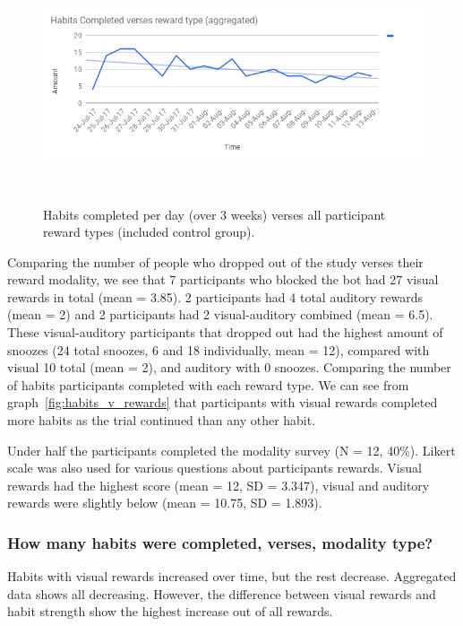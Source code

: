 \documentclass{scaffold/sigchi}
\begin{document}
\begin{figure}
  \centering
  \includegraphics[width=1\columnwidth]{figures/allhabitscompleted-v-rewards.png}
  \caption{Habits completed per day (over 3 weeks) verses all participant reward types (included control group).}~\label{fig:allhabits_v_rewards}
\end{figure}


Comparing the number of people who dropped out of the study verses their reward modality, we see that 7 participants who blocked the bot had 27 visual rewards in total (mean = 3.85). 2 participants had 4 total auditory rewards (mean = 2) and 2 participants had 2 visual-auditory combined (mean = 6.5). These visual-auditory participants that dropped out had the highest amount of snoozes (24 total snoozes, 6 and 18 individually, mean = 12), compared with visual 10 total (mean = 2), and auditory with 0 snoozes.\newline
\newline
Comparing the number of habits participants completed with each reward type. We can see from graph~\ref{fig:habits_v_rewards} that participants with visual rewards completed more habits as the trial continued than any other habit.  


Under half the participants completed the modality survey (N = 12, 40\%). Likert scale was also used for various questions about participants rewards. Visual rewards had the highest score (mean = 12, SD = 3.347), visual and auditory rewards were slightly below (mean = 10.75, SD = 1.893).

\subsubsection{How many habits were completed, verses, modality type?}
Habits with visual rewards increased over time, but the rest decrease. Aggregated data shows all decreasing. However, the difference between visual rewards and habit strength show the highest increase out of all rewards.
\end{document}
